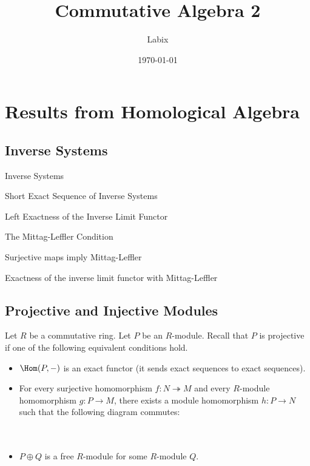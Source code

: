 \documentclass[a4paper]{article}
\title{Commutative Algebra 2}
\author{Labix}
\date{\today}
\begin{document}
\maketitle
\begin{abstract}
\end{abstract}
\pagebreak
\tableofcontents

\pagebreak
\section{Results from Homological Algebra}
\subsection{Inverse Systems}
\begin{defn}{Inverse Systems}{}
\end{defn}

\begin{defn}{Short Exact Sequence of Inverse Systems}{}
\end{defn}

\begin{prp}{}{} Left Exactness of the Inverse Limit Functor
\end{prp}

\begin{defn}{The Mittag-Leffler Condition}{}
\end{defn}

\begin{lmm}{}{} Surjective maps imply Mittag-Leffler
\end{lmm}

\begin{prp}{}{} Exactness of the inverse limit functor with Mittag-Leffler
\end{prp}

\subsection{Projective and Injective Modules}
Let $R$ be a commutative ring. Let $P$ be an $R$-module. Recall that $P$ is projective if one of the following equivalent conditions hold. 
\begin{itemize}
\item $\Hom(P,-)$ is an exact functor (it sends exact sequences to exact sequences). 
\item For every surjective homomorphism $f:N\twoheadrightarrow M$ and every $R$-module homomorphism $g:P\to M$, there exists a module homomorphism $h:P\to N$ such that the following diagram commutes: \\~\\
 \\
\item $P\oplus Q$ is a free $R$-module for some $R$-module $Q$. 
\end{itemize}
\end{document}

